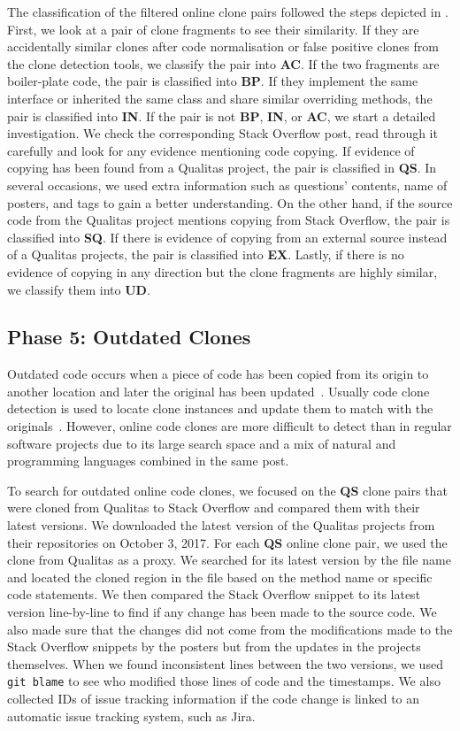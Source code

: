 \documentclass[10pt,journal,compsoc]{IEEEtran}
\begin{document}
The classification of the filtered online clone pairs followed the steps
depicted in . First, we look at a pair of clone
fragments to see their similarity. If they are accidentally similar clones after
code normalisation or false positive clones from the clone detection tools, we
classify the pair into \textbf{AC}. If the two fragments are boiler-plate code,
the pair is classified into \textbf{BP}. If they implement the same interface or
inherited the same class and share similar overriding methods, the pair is
classified into \textbf{IN}. If the pair is not \textbf{BP}, \textbf{IN}, or
\textbf{AC}, we start a detailed investigation. We check the corresponding Stack
Overflow post, read through it carefully and look for any evidence mentioning
code copying. If evidence of copying has been found from a Qualitas project, the
pair is classified in \textbf{QS}. In several occasions, we used extra
information such as questions' contents, name of posters, and tags to gain a
better understanding. On the other hand, if the source code from the Qualitas
project mentions copying from Stack Overflow, the pair is classified into
\textbf{SQ}. If there is evidence of copying from an external source instead of
a Qualitas projects, the pair is classified into \textbf{EX}. Lastly, if there
is no evidence of copying in any direction but the clone fragments are highly
similar, we classify them into \textbf{UD}.

\subsection{Phase 5: Outdated Clones} Outdated code occurs when a piece of code
has been copied from its origin to another location and later the original has
been updated~\cite{Xia2014}. Usually code clone detection is used to locate
clone instances and update them to match with the originals~\cite{Bellon2007}.
However, online code clones are more difficult to detect than in regular
software projects due to its large search space and a mix of natural and
programming languages combined in the same post.

To search for outdated online code clones, we focused on the \textbf{QS} clone
pairs that were cloned from Qualitas to Stack Overflow and compared them with
their latest versions. We downloaded the latest version of the Qualitas projects
from their repositories on October 3, 2017. For each \textbf{QS} online clone
pair, we used the clone from Qualitas as a proxy. We searched for its latest
version by the file name and located the cloned region in the file based on the
method name or specific code statements. We then compared the Stack Overflow
snippet to its latest version line-by-line to find if any change has been made
to the source code. We also made sure that the changes did not come from the
modifications made to the Stack Overflow snippets by the posters but from the
updates in the projects themselves. When we found inconsistent lines between the
two versions, we used {\small\texttt{git blame}} to see who modified those lines
of code and the timestamps. We also collected IDs of issue tracking information
if the code change is linked to an automatic issue tracking system, such as Jira.
\end{document}
